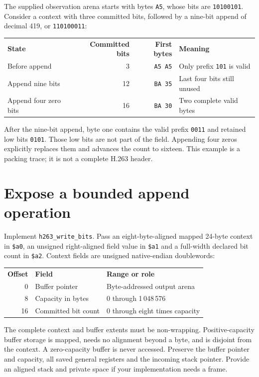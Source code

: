 The supplied observation arena starts with bytes \texttt{A5}, whose bits are
\texttt{10100101}. Consider a context with three committed bits, followed by a
nine-bit append of decimal 419, or \texttt{110100011}:
\begin{center}
\begin{tabular}{lrrl}
\textbf{State} & \textbf{Committed bits} & \textbf{First bytes} & \textbf{Meaning}\\
Before append & 3 & \texttt{A5 A5} & Only prefix \texttt{101} is valid\\
Append nine bits & 12 & \texttt{BA 35} & Last four bits still unused\\
Append four zero bits & 16 & \texttt{BA 30} & Two complete valid bytes
\end{tabular}
\end{center}
After the nine-bit append, byte one contains the valid prefix \texttt{0011}
and retained low bits \texttt{0101}. Those low bits are not part of the field.
Appending four zeros explicitly replaces them and advances the count to sixteen.
This example is a packing trace; it is not a complete H.263 header.

\section{Expose a bounded append operation}
Implement \texttt{h263\_write\_bits}. Pass an eight-byte-aligned mapped 24-byte
context in \texttt{\$a0}, an unsigned right-aligned field value in \texttt{\$a1}
and a full-width declared bit count in \texttt{\$a2}. Context fields are unsigned
native-endian doublewords:
\begin{center}
\begin{tabular}{rll}
\textbf{Offset} & \textbf{Field} & \textbf{Range or role}\\
0 & Buffer pointer & Byte-addressed output arena\\
8 & Capacity in bytes & 0 through 1\,048\,576\\
16 & Committed bit count & 0 through eight times capacity
\end{tabular}
\end{center}
The complete context and buffer extents must be non-wrapping. Positive-capacity
buffer storage is mapped, needs no alignment beyond a byte, and is disjoint from
the context. A zero-capacity buffer is never accessed. Preserve the buffer pointer
and capacity, all saved general registers and the incoming stack pointer. Provide
an aligned stack and private space if your implementation needs a frame.

